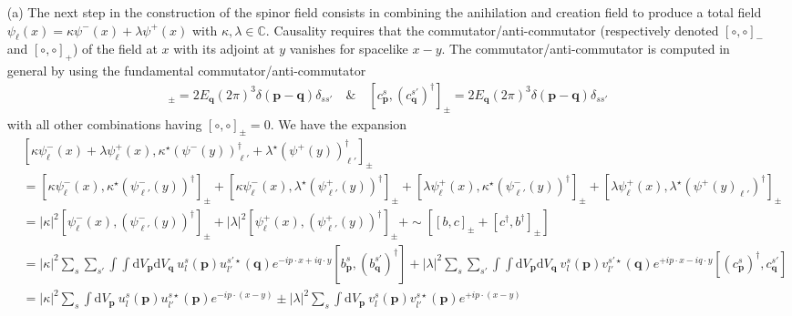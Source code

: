 \documentclass[10pt, a4paper]{article}
\begin{document}
\begin{enumerate}
  \item[(a)] The next step in the construction of the spinor field consists in combining the anihilation and creation field to produce a total field $\psi_\ell(x) = \kappa \psi^-(x) + \lambda \psi^+(x)$ with $\kappa, \lambda \in \mathbb{C}$. Causality requires that the commutator/anti-commutator (respectively denoted $[\circ,\circ]_-$ and $[\circ,\circ]_+$) of the field at $x$ with its adjoint at $y$ vanishes for spacelike $x-y$. The commutator/anti-commutator is computed in general by using the fundamental commutator/anti-commutator
  \begin{align*}
    [b^{s}_\mathbf{p}, (b^{s'}_\mathbf{q})^\dagger]_{\pm} = 2E_\mathbf{q} (2\pi)^3 \delta(\mathbf{p} - \mathbf{q})\delta_{ss'} \quad \& \quad [c^{s}_\mathbf{p}, (c^{s'}_\mathbf{q})^\dagger]_{\pm} = 2E_\mathbf{q} (2\pi)^3 \delta(\mathbf{p} - \mathbf{q})\delta_{ss'} 
  \end{align*}
  with all other combinations having $[\circ,\circ]_\pm = 0$. We have the expansion 
  \begin{align*}
    &[\kappa \psi^-_\ell(x) + \lambda \psi^+_\ell(x), \kappa^\star (\psi^-(y))_{\ell'}^{\dagger} + \lambda^\star (\psi^+(y))_{\ell'}^\dagger]_{\pm}\\
    &= [\kappa \psi^-_{\ell}(x), \kappa^\star (\psi^-_{\ell'}(y))^{\dagger}]_{\pm} + [\kappa \psi^-_{\ell}(x),\lambda^\star (\psi^+_{\ell'}(y))^\dagger]_{\pm} + [\lambda \psi^+_{\ell}(x), \kappa^\star (\psi^-_{\ell'}(y))^{\dagger}]_{\pm} + [\lambda \psi^+_{\ell}(x), \lambda^\star (\psi^+(y)_{\ell'})^\dagger]_{\pm}\\
    &=|\kappa|^2[\psi^-_{\ell}(x), (\psi^-_{\ell'}(y))^{\dagger}]_{\pm} + |\lambda|^2[ \psi^+_{\ell}(x), (\psi^+_{\ell'}(y))^\dagger]_{\pm} +\sim \left[ [b,c]_{\pm} + [c^\dagger, b^{\dagger}]_{\pm}\right]\\
    &= |\kappa|^2  \sum_s \sum_{s'} \int \int \text{d}V_\mathbf{p} \text{d}V_\mathbf{q} \ u_l^s(\mathbf{p}) u_{l'}^{s'\star}(\mathbf{q}) e^{-i p \cdot x + i q \cdot y} [b_\mathbf{p}^s, (b_\mathbf{q}^{s'})^{\dagger}] + |\lambda|^2  \sum_s \sum_{s'} \int \int \text{d}V_\mathbf{p} \text{d}V_\mathbf{q} \ v_l^s(\mathbf{p}) v_{l'}^{s'\star}(\mathbf{q}) e^{+i p \cdot x - i q \cdot y} [(c_\mathbf{p}^s)^{\dagger}, c_\mathbf{q}^{s'}]\\
    &= |\kappa|^2  \sum_s \int \text{d}V_\mathbf{p} \ u_l^s(\mathbf{p}) u_{l'}^{s\star}(\mathbf{p}) e^{-i p \cdot (x - y)} \pm |\lambda|^2  \sum_s \int \text{d}V_\mathbf{p} \ v_l^s(\mathbf{p}) v_{l'}^{s\star}(\mathbf{p}) e^{+i p \cdot (x - y)}\\

\end{align*}
\end{enumerate}
\end{document}
